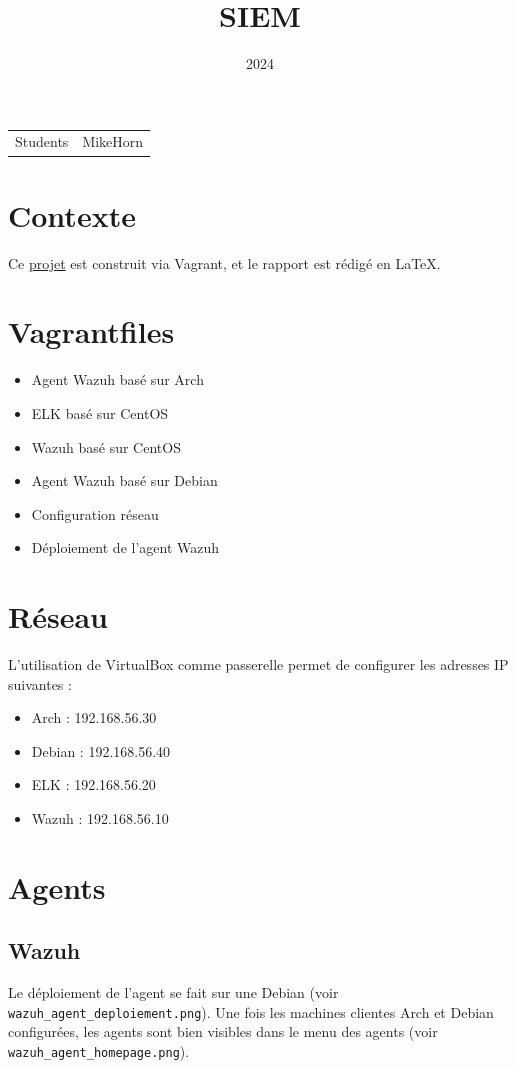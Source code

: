 \documentclass{article}
\title{SIEM}
\date{2024}
\begin{document}
\maketitle

\noindent\begin{tabular}{@{}ll}
    Students & MikeHorn
\end{tabular}

\section*{Contexte}
Ce \href{https://github.com/MikeHorn-git/SIEM}{projet} est construit via Vagrant, et le rapport est rédigé en LaTeX.

\section{Vagrantfiles}

\begin{itemize}
    \item Agent Wazuh basé sur Arch
    \item ELK basé sur CentOS
    \item Wazuh basé sur CentOS
    \item Agent Wazuh basé sur Debian
    \item Configuration réseau
    \item Déploiement de l'agent Wazuh
\end{itemize}

\section{Réseau}

L'utilisation de VirtualBox comme passerelle permet de configurer les adresses IP suivantes :

\begin{itemize}
    \item Arch : 192.168.56.30
    \item Debian : 192.168.56.40
    \item ELK : 192.168.56.20
    \item Wazuh : 192.168.56.10
\end{itemize}

\section{Agents}

\subsection{Wazuh}
Le déploiement de l'agent se fait sur une Debian (voir \texttt{wazuh\_agent\_deploiement.png}).  
Une fois les machines clientes Arch et Debian configurées, les agents sont bien visibles dans le menu des agents (voir \texttt{wazuh\_agent\_homepage.png}).
\end{document}

